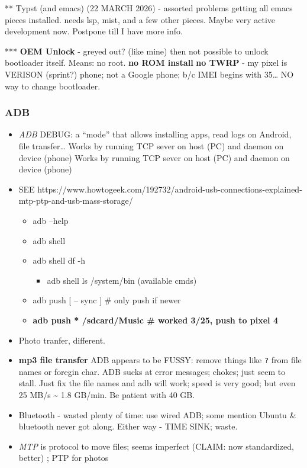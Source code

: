 \documentclass[
  letterpaper,
  DIV=11,
  numbers=noendperiod]{scrartcl}
\providecommand{\tightlist}{%
  \setlength{\itemsep}{0pt}\setlength{\parskip}{0pt}}\usepackage{longtable,booktabs,array}
\begin{document}
** Typst (and emacs) (22 MARCH 2026) - assorted problems getting all
emacs pieces installed. needs lsp, mist, and a few other pieces. Maybe
very active development now. Postpone till I have more info.

*** \textbf{OEM Unlock} - greyed out? (like mine) then not possible to
unlock bootloader itself. Means: no root. \textbf{no ROM install}
\textbf{no TWRP} - my pixel is VERISON (sprint?) phone; not a Google
phone; b/c IMEI begins with 35\ldots{} NO way to change bootloader.

\subsubsection{ADB}\label{adb}

\begin{itemize}
\item
  \emph{ADB} DEBUG: a ``mode'' that allows installing apps, read logs on
  Android, file transfer\ldots{} Works by running TCP sever on host (PC)
  and daemon on device (phone) Works by running TCP sever on host (PC)
  and daemon on device (phone)
\item
  SEE
  https://www.howtogeek.com/192732/android-usb-connections-explained-mtp-ptp-and-usb-mass-storage/

  \begin{itemize}
  \tightlist
  \item
    adb --help
  \item
    adb shell
  \item
    adb shell df -h

    \begin{itemize}
    \tightlist
    \item
      adb shell ls /system/bin (available cmds)
    \end{itemize}
  \item
    adb push {[} -- sync {]} \# only push if newer
  \item
    \textbf{adb push * /sdcard/Music \# worked 3/25, push to pixel 4}
  \end{itemize}
\item
  Photo tranfer, different.
\item
  \textbf{mp3 file transfer} ADB appears to be FUSSY: remove things like
  \texttt{?} from file names or foregin char. ADB sucks at error
  messages; chokes; just seem to stall. Just fix the file names and adb
  will work; speed is very good; but even 25 MB/s \textasciitilde{} 1.8
  GB/min. Be patient with 40 GB.
\item
  Bluetooth - wasted plenty of time: use wired ADB; some mention Ubuntu
  \& bluetooth never got along. Either way - TIME SINK; waste.
\item
  \emph{MTP} is protocol to move files; seems imperfect (CLAIM: now
  standardized, better) ; PTP for photos
\end{itemize}
\end{document}
